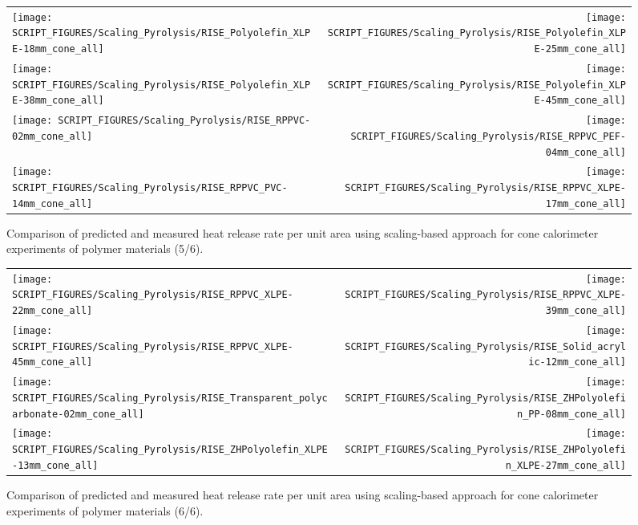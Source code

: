 \begin{figure}[!h]
\begin{tabular*}{\textwidth}{l@{\extracolsep{\fill}}r}
\texttt{[image: SCRIPT\_FIGURES/Scaling\_Pyrolysis/RISE\_Polyolefin\_XLPE-18mm\_cone\_all]} &
\texttt{[image: SCRIPT\_FIGURES/Scaling\_Pyrolysis/RISE\_Polyolefin\_XLPE-25mm\_cone\_all]} \\
\texttt{[image: SCRIPT\_FIGURES/Scaling\_Pyrolysis/RISE\_Polyolefin\_XLPE-38mm\_cone\_all]} &
\texttt{[image: SCRIPT\_FIGURES/Scaling\_Pyrolysis/RISE\_Polyolefin\_XLPE-45mm\_cone\_all]} \\
\texttt{[image: SCRIPT\_FIGURES/Scaling\_Pyrolysis/RISE\_RPPVC-02mm\_cone\_all]} &
\texttt{[image: SCRIPT\_FIGURES/Scaling\_Pyrolysis/RISE\_RPPVC\_PEF-04mm\_cone\_all]} \\
\texttt{[image: SCRIPT\_FIGURES/Scaling\_Pyrolysis/RISE\_RPPVC\_PVC-14mm\_cone\_all]} &
\texttt{[image: SCRIPT\_FIGURES/Scaling\_Pyrolysis/RISE\_RPPVC\_XLPE-17mm\_cone\_all]} \\
\end{tabular*}
\caption[HRRPUA of RISE materials using scaling model, polymer materials]
{Comparison of predicted and measured heat release rate per unit area using scaling-based approach for cone calorimeter experiments of polymer materials (5/6).}
\label{RISE_Materials_polymers5}
\end{figure}

\begin{figure}[!h]
\begin{tabular*}{\textwidth}{l@{\extracolsep{\fill}}r}
\texttt{[image: SCRIPT\_FIGURES/Scaling\_Pyrolysis/RISE\_RPPVC\_XLPE-22mm\_cone\_all]} &
\texttt{[image: SCRIPT\_FIGURES/Scaling\_Pyrolysis/RISE\_RPPVC\_XLPE-39mm\_cone\_all]} \\
\texttt{[image: SCRIPT\_FIGURES/Scaling\_Pyrolysis/RISE\_RPPVC\_XLPE-45mm\_cone\_all]} &
\texttt{[image: SCRIPT\_FIGURES/Scaling\_Pyrolysis/RISE\_Solid\_acrylic-12mm\_cone\_all]} \\
\texttt{[image: SCRIPT\_FIGURES/Scaling\_Pyrolysis/RISE\_Transparent\_polycarbonate-02mm\_cone\_all]} &
\texttt{[image: SCRIPT\_FIGURES/Scaling\_Pyrolysis/RISE\_ZHPolyolefin\_PP-08mm\_cone\_all]} \\
\texttt{[image: SCRIPT\_FIGURES/Scaling\_Pyrolysis/RISE\_ZHPolyolefin\_XLPE-13mm\_cone\_all]} &
\texttt{[image: SCRIPT\_FIGURES/Scaling\_Pyrolysis/RISE\_ZHPolyolefin\_XLPE-27mm\_cone\_all]} \\
\end{tabular*}
\caption[HRRPUA of RISE materials using scaling model, polymer materials]
{Comparison of predicted and measured heat release rate per unit area using scaling-based approach for cone calorimeter experiments of polymer materials (6/6).}
\label{RISE_Materials_polymers6}
\end{figure}

